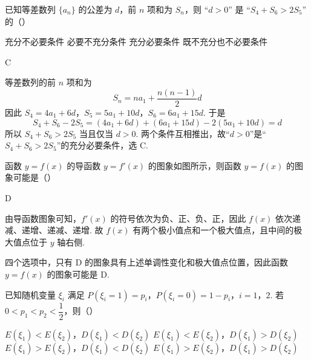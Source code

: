 \begin{problem}
已知等差数列 \(\{a_n\}\) 的公差为 \(d\)，前 \(n\) 项和为 \(S_n\)，则 “\(d>0\)” 是 “\(S_4+S_6>2S_5\)” 的（\quad）

\choices
    {充分不必要条件}
    {必要不充分条件}
    {充分必要条件}
    {既不充分也不必要条件}
\end{problem}

\begin{answer}
C
\end{answer}

\begin{solution}
等差数列的前 \(n\) 项和为
\[
S_n=na_1+\frac{n(n-1)}{2}d
\]
因此
\(S_4=4a_1+6d\)，\(S_5=5a_1+10d\)，\(S_6=6a_1+15d\).
于是
\[
S_4+S_6-2S_5=(4a_1+6d)+(6a_1+15d)-2(5a_1+10d)=d
\]
所以 \(S_4+S_6>2S_5\) 当且仅当 \(d>0\). 两个条件互相推出，故“\(d>0\)”是“\(S_4+S_6>2S_5\)”的充分必要条件，选 C.
\end{solution}

\begin{problem}
函数 \(y=f(x)\) 的导函数 \(y=f'(x)\) 的图象如图所示，则函数 \(y=f(x)\) 的图象可能是（\quad）

\begin{center}
\end{center}

    {}
    {}
    {}
\end{problem}

\begin{answer}
D
\end{answer}

\begin{solution}
由导函数图象可知，\(f'(x)\) 的符号依次为负、正、负、正，因此 \(f(x)\) 依次递减、递增、递减、递增. 故 \(f(x)\) 有两个极小值点和一个极大值点，且中间的极大值点位于 \(y\) 轴右侧.

四个选项中，只有 D 的图象具有上述单调性变化和极大值点位置，因此函数 \(y=f(x)\) 的图象可能是 D.
\end{solution}

\begin{problem}
已知随机变量 \(\xi_i\) 满足 \(P(\xi_i=1)=p_i\)，\(P(\xi_i=0)=1-p_i\)，\(i=1\)，\(2\). 若 \(0<p_1<p_2<\dfrac12\)，则（\quad）

\choices
    {\(E(\xi_1)<E(\xi_2)\)，\(D(\xi_1)<D(\xi_2)\)}
    {\(E(\xi_1)<E(\xi_2)\)，\(D(\xi_1)>D(\xi_2)\)}
    {\(E(\xi_1)>E(\xi_2)\)，\(D(\xi_1)<D(\xi_2)\)}
    {\(E(\xi_1)>E(\xi_2)\)，\(D(\xi_1)>D(\xi_2)\)}
\end{problem}

